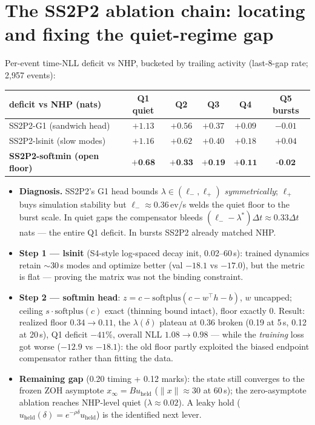\documentclass[11pt]{article}
\newcommand{\bb}[1]{\textbf{#1}}
\begin{document}
\section{The SS2P2 ablation chain: locating and fixing the quiet-regime gap}
Per-event time-NLL deficit vs NHP, bucketed by trailing activity (last-8-gap rate; 2{,}957 events):
\begin{center}\small\renewcommand{\arraystretch}{1.2}
\begin{tabular}{lccccc}
\toprule
deficit vs NHP (nats) & Q1 quiet & Q2 & Q3 & Q4 & Q5 bursts\\
\midrule
SS2P2-G1 (sandwich head) & $+1.13$ & $+0.56$ & $+0.37$ & $+0.09$ & $-0.01$\\
SS2P2-lsinit (slow modes) & $+1.16$ & $+0.62$ & $+0.40$ & $+0.18$ & $+0.04$\\
\rowcolor{ours}\textbf{SS2P2-softmin (open floor)} & $\bb{+0.68}$ & $\bb{+0.33}$ & $\bb{+0.19}$ & $\bb{+0.11}$ & $\bb{-0.02}$\\
\bottomrule
\end{tabular}
\end{center}
\begin{itemize}[leftmargin=1.35em,itemsep=2pt]
\item \textbf{Diagnosis.} SS2P2's G1 head bounds $\lambda\in(\ell_-,\ell_+)$ \emph{symmetrically};
$\ell_+$ buys simulation stability but $\ell_-\!\approx\!0.36$\,ev/s welds the quiet floor to the burst
scale. In quiet gaps the compensator bleeds $(\ell_--\lambda^*)\Delta t\approx0.33\Delta t$ nats ---
the entire Q1 deficit. In bursts SS2P2 already matched NHP.
\item \textbf{Step 1 --- lsinit} (S4-style log-spaced decay init, 0.02--60\,s): trained dynamics retain
$\sim$30\,s modes and optimize better (val $-18.1$ vs $-17.0$), but the metric is flat --- proving the
matrix was not the binding constraint.
\item \textbf{Step 2 --- softmin head}: $z=c-\mathrm{softplus}(c-w^{\top}h-b)$, $w$ uncapped;
ceiling $s\cdot\mathrm{softplus}(c)$ exact (thinning bound intact), floor exactly 0.
Result: realized floor $0.34\!\to\!0.11$, the $\lambda(\delta)$ plateau at 0.36 broken
(0.19 at 5\,s, 0.12 at 20\,s), Q1 deficit $-41\%$, overall NLL $1.08\to0.98$ --- while the
\emph{training} loss got worse ($-12.9$ vs $-18.1$): the old floor partly exploited the biased
endpoint compensator rather than fitting the data.
\item \textbf{Remaining gap} (0.20 timing + 0.12 marks): the state still converges to the frozen ZOH
asymptote $x_\infty=Bu_{\text{held}}$ ($\|x\|\!\approx\!30$ at 60\,s); the zero-asymptote ablation
reaches NHP-level quiet ($\lambda\approx0.02$). A leaky hold
($u_{\text{held}}(\delta)=e^{-\rho\delta}u_{\text{held}}$) is the identified next lever.
\end{itemize}
\end{document}
